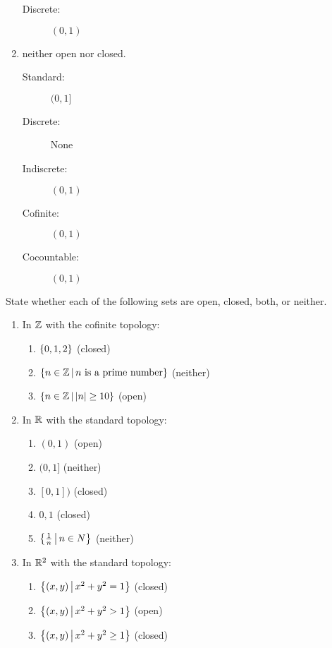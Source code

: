 \documentclass[letterpaper,12pt,fleqn]{article}
\begin{document}
\begin{example}
\begin{enumerate}
    \begin{description}
    \item[Discrete:] \((0,1)\)
    \end{description}

  \item neither open nor closed.

    \begin{description}
    \item[Standard:] \((0,1]\)
    \item[Discrete:] None
    \item[Indiscrete:] \((0,1)\)
    \item[Cofinite:] \((0,1)\)
    \item[Cocountable:] \((0,1)\)
    \end{description}
  \end{enumerate}
\end{example}

\begin{example}
  State whether each of the following sets are open, closed, both, or neither.
  \begin{enumerate}
  \item In \(\mathbb{Z}\) with the cofinite topology:
    \begin{enumerate}
    \item \(\{0,1,2\}\) (closed)
    \item \(\left\{{n\in\mathbb{Z}}\,\middle|\,{n\ \text{is a prime number}}\right\}\) (neither)
    \item \(\left\{{n\in\mathbb{Z}}\,\middle|\,{\lvert n\rvert\ge10}\right\}\) (open)
    \end{enumerate}

  \item In \(\mathbb{R}\) with the standard topology:
    \begin{enumerate}
    \item \((0,1)\) (open)
    \item \((0,1]\) (neither)
    \item \([0,1])\) (closed)
    \item \({0,1}\) (closed)
    \item \(\left\{{\frac{1}{n}}\,\middle|\,{n\in N}\right\}\) (neither)
    \end{enumerate}

  \item In \(\mathbb{R}^2\) with the standard topology:
    \begin{enumerate}
    \item \(\left\{{(x,y)}\,\middle|\,{x^2+y^2=1}\right\}\) (closed)
    \item \(\left\{{(x,y)}\,\middle|\,{x^2+y^2>1}\right\}\) (open)
    \item \(\left\{{(x,y)}\,\middle|\,{x^2+y^2\ge1}\right\}\) (closed)
    \end{enumerate}
  \end{enumerate}
\end{example}
\end{document}
